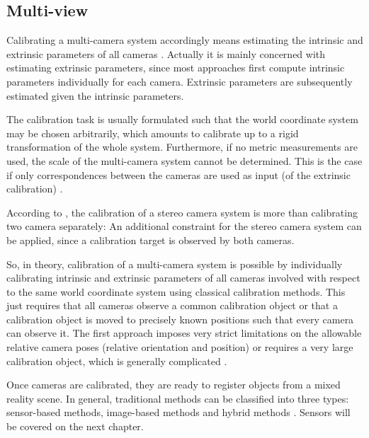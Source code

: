 \documentclass[msc, a4paper, classic, en]{ufbathesis}
\begin{document}
\subsection{Multi-view}

Calibrating a multi-camera system accordingly means estimating the intrinsic and extrinsic parameters of all cameras \cite{bajramovic2010self}. Actually it is mainly concerned with estimating extrinsic parameters, since most approaches first compute intrinsic parameters individually for each camera. Extrinsic parameters are subsequently estimated given the intrinsic parameters.

The calibration task is usually formulated such that the world coordinate system may be chosen arbitrarily, which amounts to calibrate up to a rigid transformation of the whole system. Furthermore, if no metric measurements are used, the scale of the multi-camera system cannot be determined. This is the case if only correspondences between the cameras are used as input (of the extrinsic calibration) \cite{bajramovic2010self}.

According to \cite{hanning2011high}, the calibration of a stereo camera system is more than calibrating two camera separately: An additional constraint for the stereo camera system can be applied, since a calibration target is observed by both cameras.

So, in theory, calibration of a multi-camera system is possible by individually calibrating intrinsic and extrinsic parameters of all cameras involved with respect to the same world coordinate system using classical calibration methods. This just requires that all cameras observe a common calibration object or that a calibration object is moved to precisely known positions such that every camera can observe it. The first approach imposes very strict limitations on the allowable relative camera poses (relative orientation and position) or requires a very large calibration object, which is generally complicated \cite{Chen00widearea}.

Once cameras are calibrated, they are ready to register objects from a mixed reality scene. In general, traditional methods can be classified into three types: sensor-based methods, image-based methods and hybrid methods \cite{shumaker2011virtual}. Sensors will be covered on the next chapter.

\end{document}
